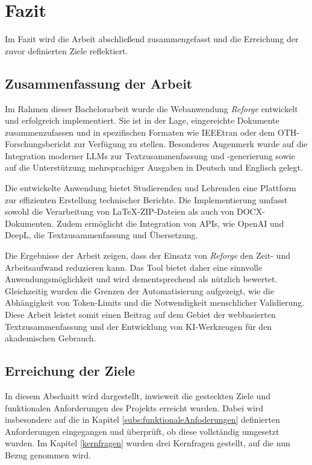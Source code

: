 \chapter{Fazit}

Im Fazit wird die Arbeit abschließend zusammengefasst und die Erreichung der zuvor definierten Ziele reflektiert.

\section{Zusammenfassung der Arbeit}
Im Rahmen dieser Bachelorarbeit wurde die Webanwendung \textit{Reforge} entwickelt und erfolgreich implementiert. Sie ist in der Lage, eingereichte Dokumente zusammenzufassen und in spezifischen Formaten wie IEEEtran oder dem OTH-Forschungsbericht zur Verfügung zu stellen. Besonderes Augenmerk wurde auf die Integration moderner \ac{LLM}s zur Textzusammenfassung und -generierung sowie auf die Unterstützung mehrsprachiger Ausgaben in Deutsch und Englisch gelegt.

Die entwickelte Anwendung bietet Studierenden und Lehrenden eine Plattform zur effizienten Erstellung technischer Berichte. Die Implementierung umfasst sowohl die Verarbeitung von LaTeX-ZIP-Dateien als auch von \ac{DOCX}-Dokumenten. Zudem ermöglicht die Integration von \ac{API}s, wie OpenAI und DeepL, die Textzusammenfassung und Übersetzung.

Die Ergebnisse der Arbeit zeigen, dass der Einsatz von \textit{Reforge} den Zeit- und Arbeitsaufwand reduzieren kann. Das Tool bietet daher eine sinnvolle Anwendungsmöglichkeit und wird dementsprechend als nützlich bewertet. Gleichzeitig wurden die Grenzen der Automatisierung aufgezeigt, wie die Abhängigkeit von Token-Limits und die Notwendigkeit menschlicher Validierung. Diese Arbeit leistet somit einen Beitrag auf dem Gebiet der webbasierten Textzusammenfassung und der Entwicklung von \ac{KI}-Werkzeugen für den akademischen Gebrauch.

\section{Erreichung der Ziele}
In diesem Abschnitt wird dargestellt, inwieweit die gesteckten Ziele und funktionalen Anforderungen des Projekts erreicht wurden. Dabei wird insbesondere auf die in Kapitel \ref{subs:funktionaleAnfoderungen} definierten Anforderungen eingegangen und überprüft, ob diese vollständig umgesetzt wurden. Im Kapitel \ref{kernfragen} wurden drei Kernfragen gestellt, auf die nun Bezug genommen wird. 

